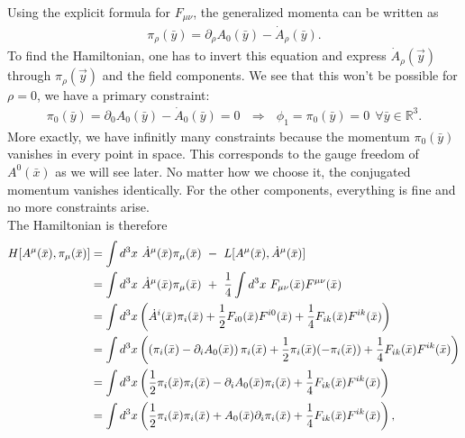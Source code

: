Using the explicit formula for $F_{\mu \nu}$, the generalized momenta can be written as
\begin{align}
\pi_{\rho}(\bar{y}) = \partial_{\rho} A_0(\bar{y}) - \dot{A}_{\rho}(\bar{y}).
\end{align}
\label{sec:electrodynamics_primary_constraints}
To find the Hamiltonian, one has to invert this equation and express $\dot{A}_{\rho}(\vec{y})$ through $\pi_{\rho}(\vec{y})$ and the field components. We see that this won't be possible for $\rho = 0$, we have a primary constraint:
\begin{align}
\pi_0(\bar{y}) = \partial_0 A_0(\bar{y}) - \dot{A}_0(\bar{y}) = 0 \ \ \ \Longrightarrow \ \ \ \phi_1 = \pi_0(\bar{y}) = 0 \ \ \forall \bar{y} \in \mathbb{R}^3.
\end{align}
More exactly, we have infinitly many constraints because the momentum $\pi_0(\bar{y})$ vanishes in every point in space. This corresponds to the gauge freedom of $A^0(\bar{x})$ as we will see later. No matter how we choose it, the conjugated momentum vanishes identically. For the other components, everything is fine and no more constraints arise. \\
\label{sec:electrodynamics_hamiltonian}
The Hamiltonian is therefore
\begin{align}
H[A^{\mu}(\bar{x}), \pi_{\mu}(\bar{x})] &= \int d^3 x \ \dot{A}^{\mu}(\bar{x}) \pi_{\mu}(\bar{x}) \ - \ L[A^{\mu}(\bar{x}), \dot{A}^{\mu}(\bar{x})] \notag \\
&= \int d^3 x \ \dot{A}^{\mu}(\bar{x}) \pi_{\mu}(\bar{x}) \ + \  \frac{1}{4} \displaystyle\int d^3 x \ F_{\mu \nu}(\bar{x}) F^{\mu \nu}(\bar{x}) \notag \\
&= \int d^3 x \left( \dot{A}^{i}(\bar{x}) \pi_{i}(\bar{x}) + \frac{1}{2} F_{i 0}(\bar{x}) F^{i 0}(\bar{x}) + \frac{1}{4} F_{i k}(\bar{x}) F^{i k}(\bar{x}) \right) \notag \\
&= \int d^3 x \left( \left( \pi_i(\bar{x}) - \partial_i A_0(\bar{x}) \right) \pi_i(\bar{x}) + \frac{1}{2} \pi_i(\bar{x}) (- \pi_i(\bar{x})) + \frac{1}{4} F_{i k}(\bar{x}) F^{i k}(\bar{x}) \right) \notag \\
&= \int d^3 x \left( \frac{1}{2} \pi_i(\bar{x})\pi_i(\bar{x}) - \partial_i A_0(\bar{x}) \pi_i(\bar{x}) + \frac{1}{4} F_{i k}(\bar{x}) F^{i k}(\bar{x}) \right) \notag \\
&= \int d^3 x \left( \frac{1}{2} \pi_i(\bar{x})\pi_i(\bar{x}) + A_0(\bar{x}) \partial_i \pi_i(\bar{x}) + \frac{1}{4} F_{i k}(\bar{x}) F^{i k}(\bar{x}) \right),
\end{align}
